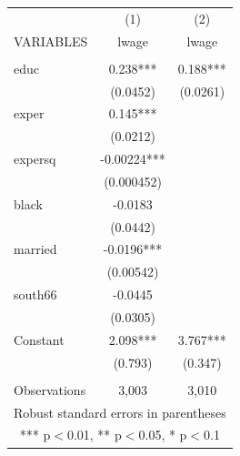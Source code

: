 \documentclass[]{article}
\begin{document}
\begin{tabular}{lcc} \hline
 & (1) & (2) \\
VARIABLES & lwage & lwage \\ \hline
 &  &  \\
educ & 0.238*** & 0.188*** \\
 & (0.0452) & (0.0261) \\
exper & 0.145*** &  \\
 & (0.0212) &  \\
expersq & -0.00224*** &  \\
 & (0.000452) &  \\
black & -0.0183 &  \\
 & (0.0442) &  \\
married & -0.0196*** &  \\
 & (0.00542) &  \\
south66 & -0.0445 &  \\
 & (0.0305) &  \\
Constant & 2.098*** & 3.767*** \\
 & (0.793) & (0.347) \\
 &  &  \\
 Observations & 3,003 & 3,010 \\ \hline
\multicolumn{3}{c}{ Robust standard errors in parentheses} \\
\multicolumn{3}{c}{ *** p$<$0.01, ** p$<$0.05, * p$<$0.1} \\
\end{tabular}
\end{document}
